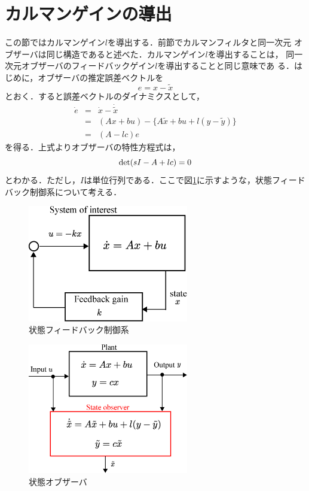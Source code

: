 \documentclass[a4paper,12pt]{jarticle}
\begin{document}
\section{カルマンゲインの導出}
この節ではカルマンゲイン$l$を導出する．前節でカルマンフィルタと同一次元
オブザーバは同じ構造であると述べた．カルマンゲイン$l$を導出することは，
同一次元オブザーバのフィードバックゲイン$l$を導出することと同じ意味であ
る．はじめに，オブザーバの推定誤差ベクトルを
\begin{equation}
 e = x - \tilde{x}
\end{equation}
とおく．すると誤差ベクトルのダイナミクスとして，
\begin{eqnarray}
 \dot{e} & = & \dot{x} - \dot{\tilde{x}} \\
 & = & (Ax+bu) - \bigl\{ A\tilde{x} + bu + l(y - \tilde{y} )\bigr\} \\
 & = & (A-lc)e
\end{eqnarray}
を得る．上式よりオブザーバの特性方程式は，
\begin{equation}\label{equ:obtk}
 {\rm{det}} (sI-A+lc)=0
\end{equation}
とわかる．ただし，$I$は単位行列である．ここで図\ref{fig:state_fb}に示すような，状態フィード
バック制御系について考える．
%
\begin{figure}[bp]
 \begin{center}
  \includegraphics[width = 70mm]{fig/state_fb.eps}
 \end{center}
 \caption{状態フィードバック制御系}
 \label{fig:state_fb}
\end{figure}
%
%
\begin{figure}[tbp]
 \begin{center}
  \includegraphics[width = 70mm]{fig/state_observer.eps}
 \end{center}
 \caption{状態オブザーバ}
 \label{fig:state_ob}
\end{figure}
\end{document}
